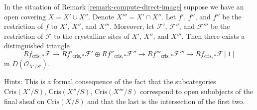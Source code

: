 \begin{remark}
\label{remark-mayer-vietoris}
In the situation of Remark \ref{remark-compute-direct-image}
suppose we have an open covering $X = X' \cup X''$. Denote
$X''' = X' \cap X''$. Let $f'$, $f''$, and $f''$ be the restriction of $f$
to $X'$, $X''$, and $X'''$. Moreover, let $\mathcal{F}'$, $\mathcal{F}''$,
and $\mathcal{F}'''$ be the restriction of $\mathcal{F}$ to the crystalline
sites of $X'$, $X''$, and $X'''$. Then there exists a distinguished triangle
$$
Rf_{\text{cris}, *}\mathcal{F}
\longrightarrow
Rf'_{\text{cris}, *}\mathcal{F}' \oplus Rf''_{\text{cris}, *}\mathcal{F}''
\longrightarrow
Rf'''_{\text{cris}, *}\mathcal{F}'''
\longrightarrow
Rf_{\text{cris}, *}\mathcal{F}[1]
$$
in $D(\mathcal{O}_{X'/S'})$.

\medskip\noindent
Hints: This is a formal consequence of the fact that the subcategories
$\text{Cris}(X'/S)$, $\text{Cris}(X''/S)$, $\text{Cris}(X'''/S)$ correspond
to open subobjects of the final sheaf on $\text{Cris}(X/S)$ and that the
last is the intersection of the first two.
\end{remark}

